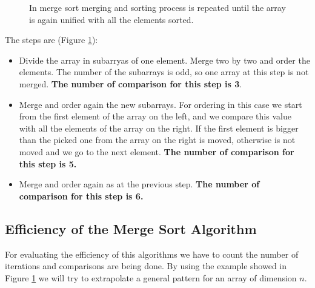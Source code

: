 \begin{figure}[H]

\caption[Merge sort algorithm.]{In merge sort merging and sorting process is repeated until the array is again unified with all the elements sorted.}
\label{sorting_6}
\end{figure}

The steps are (Figure \ref{sorting_6}): 
\begin{itemize}
\item[1] Divide the array in subarryas of one element. Merge two by two and order the elements. The number of the subarrays is odd, so one array at this step is not merged. \textbf{The number of comparison for this step is 3}.
\item[2] Merge and order again the new subarrays. For ordering in this case we start from the first element of the array on the left, and we compare this value with all the elements of the array on the right. If the first element is bigger than the picked one from the array on the right is moved, otherwise is not moved and we go to the next element. \textbf{The number of comparison for this step is 5.}   
\item[3] Merge and order again as at the previous step. \textbf{The number of comparison for this step is 6.}
\end{itemize}

\subsection{Efficiency of the Merge Sort Algorithm}
For evaluating the efficiency of this algorithms we have to count the number of iterations and comparisons are being done. By using the example showed in Figure \ref{sorting_6} we will try to extrapolate a general pattern for an array of dimension \(n\).

